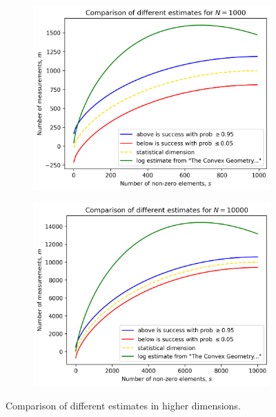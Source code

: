 \begin{figure}
    \begin{subfigure}{0.5\textwidth}
        \includegraphics[width=\linewidth]{pictures/compare_estimates1000}
    \end{subfigure}
    \begin{subfigure}{0.5\textwidth}
        \includegraphics[width=\linewidth]{pictures/compare_estimates10000}
    \end{subfigure}
    \caption{\centering Comparison of different estimates in higher dimensions.}
    \label{fig:compare}
\end{figure}